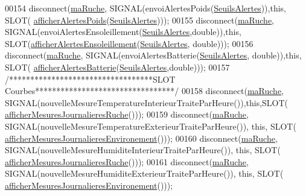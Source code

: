 \begin{DoxyCode}
00154     disconnect(\hyperlink{class_ruche_ihm_a43a6b1fa31f4fba58d919daae3707b38}{maRuche}, SIGNAL(envoiAlertesPoids(\hyperlink{parametres_8h_aaa6de8207c94675264c90b10b613368d}{SeuilsAlertes})),\textcolor{keyword}{this}, SLOT(
      \hyperlink{class_ruche_ihm_a641d05346e527c3386ed9df6a7e6fafc}{afficherAlertesPoids}(\hyperlink{parametres_8h_aaa6de8207c94675264c90b10b613368d}{SeuilsAlertes})));
00155     disconnect(\hyperlink{class_ruche_ihm_a43a6b1fa31f4fba58d919daae3707b38}{maRuche}, SIGNAL(envoiAlertesEnsoleillement(\hyperlink{parametres_8h_aaa6de8207c94675264c90b10b613368d}{SeuilsAlertes},\textcolor{keywordtype}{double})),\textcolor{keyword}{this},
      SLOT(\hyperlink{class_ruche_ihm_aea5efc506f9825db2a4eb39a40d7eb18}{afficherAlertesEnsoleillement}(\hyperlink{parametres_8h_aaa6de8207c94675264c90b10b613368d}{SeuilsAlertes}, \textcolor{keywordtype}{double})));
00156     disconnect(\hyperlink{class_ruche_ihm_a43a6b1fa31f4fba58d919daae3707b38}{maRuche}, SIGNAL(envoiAlertesBatterie(\hyperlink{parametres_8h_aaa6de8207c94675264c90b10b613368d}{SeuilsAlertes}, \textcolor{keywordtype}{double})),\textcolor{keyword}{this}, SLOT(
      \hyperlink{class_ruche_ihm_a5181062e21dc73908b660d97e9621fb6}{afficherAlertesBatterie}(\hyperlink{parametres_8h_aaa6de8207c94675264c90b10b613368d}{SeuilsAlertes},\textcolor{keywordtype}{double})));
00157     \textcolor{comment}{/**********************************SLOT Courbes*********************************/}
00158     disconnect(\hyperlink{class_ruche_ihm_a43a6b1fa31f4fba58d919daae3707b38}{maRuche}, SIGNAL(nouvelleMesureTemperatureInterieurTraiteParHeure()),\textcolor{keyword}{this},SLOT(
      \hyperlink{class_ruche_ihm_a94bd98327a73a15aad1306fc31f53ce8}{afficherMesuresJournalieresRuche}()));
00159     disconnect(\hyperlink{class_ruche_ihm_a43a6b1fa31f4fba58d919daae3707b38}{maRuche}, SIGNAL(nouvelleMesureTemperatureExterieurTraiteParHeure()), \textcolor{keyword}{this}, SLOT(
      \hyperlink{class_ruche_ihm_a5ee5942435915ca134765f42ff4b9061}{afficherMesuresJournalieresEnvironement}()));
00160     disconnect(\hyperlink{class_ruche_ihm_a43a6b1fa31f4fba58d919daae3707b38}{maRuche}, SIGNAL(nouvelleMesureHumiditeInterieurTraiteParHeure()), \textcolor{keyword}{this}, SLOT(
      \hyperlink{class_ruche_ihm_a94bd98327a73a15aad1306fc31f53ce8}{afficherMesuresJournalieresRuche}()));
00161     disconnect(\hyperlink{class_ruche_ihm_a43a6b1fa31f4fba58d919daae3707b38}{maRuche}, SIGNAL(nouvelleMesureHumiditeExterieurTraiteParHeure()), \textcolor{keyword}{this}, SLOT(
      \hyperlink{class_ruche_ihm_a5ee5942435915ca134765f42ff4b9061}{afficherMesuresJournalieresEnvironement}()));

\end{DoxyCode}
